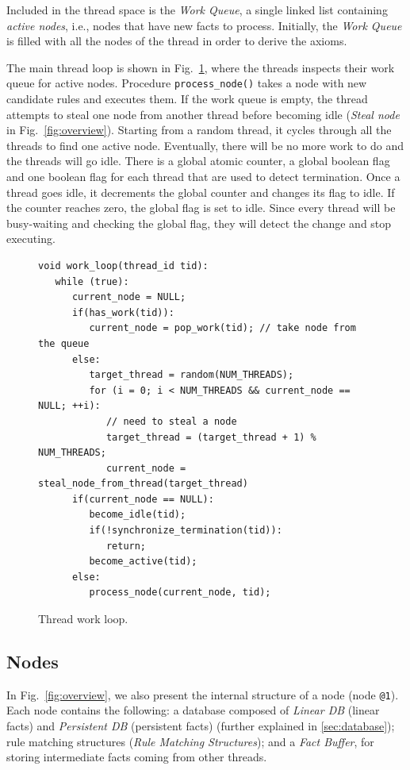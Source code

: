Included in the thread space is the \emph{Work Queue}, a single linked list containing \emph{active nodes}, i.e.,
nodes that have new facts to process. Initially, the \emph{Work Queue} is filled with all the nodes of the thread
in order to derive the axioms.

The main thread loop is shown in Fig.~\ref{code:work_loop}, where the threads
inspects their work queue for active nodes. Procedure \texttt{process\_node()} takes a node with new candidate rules
and executes them. If the work queue is empty, the thread attempts to steal one node from another thread before
becoming idle (\emph{Steal node} in Fig.~\ref{fig:overview}). Starting from a random thread, it cycles through all the threads to find one active node.
Eventually, there will be no more work to do and the threads will go idle. There is a global atomic counter, a global
boolean flag and one boolean flag for each thread that are used to detect termination.
Once a thread goes idle, it decrements the global counter and changes its flag to idle. If the counter
reaches zero, the global flag is set to idle. Since every thread will be busy-waiting and checking
the global flag, they will detect the change and stop executing.

\begin{figure}[h!]
\scriptsize\begin{Verbatim}
void work_loop(thread_id tid):
   while (true):
      current_node = NULL;
      if(has_work(tid)):
         current_node = pop_work(tid); // take node from the queue
      else:
         target_thread = random(NUM_THREADS);
         for (i = 0; i < NUM_THREADS && current_node == NULL; ++i):
            // need to steal a node
            target_thread = (target_thread + 1) % NUM_THREADS;
            current_node = steal_node_from_thread(target_thread)
      if(current_node == NULL):
         become_idle(tid);
         if(!synchronize_termination(tid)):
            return;
         become_active(tid);
      else:
         process_node(current_node, tid);
\end{Verbatim}
  \caption{Thread work loop.}
  \label{code:work_loop}
\end{figure}

\subsection{Nodes}

In Fig.~\ref{fig:overview}, we also present the internal structure of a node (node \texttt{@1}). Each node
contains the following: a database composed of \emph{Linear DB} (linear facts) and \emph{Persistent DB} (persistent facts) (further explained in \ref{sec:database});
rule matching structures (\emph{Rule Matching Structures}); and a \emph{Fact Buffer}, for storing intermediate facts coming
from other threads.

